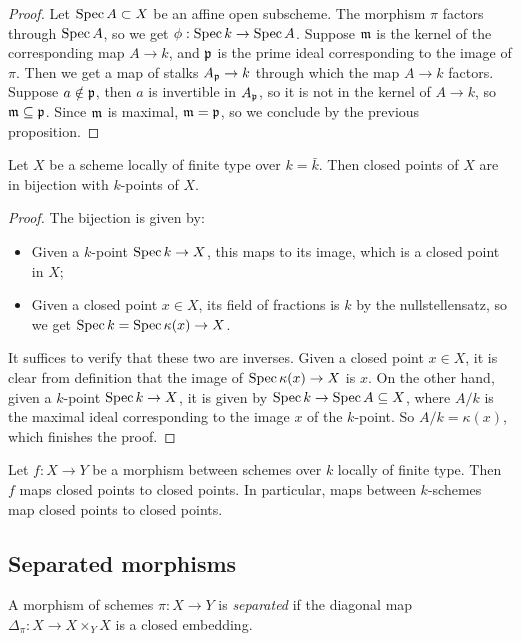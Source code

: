 \documentclass[11pt]{amsart}
\begin{document}
\begin{proof}
Let $\operatorname{Spec} A \subset X$ be an affine open subscheme. The morphism $\pi$ factors through $\operatorname{Spec} A$, so we get $\phi: \operatorname{Spec} k \to \operatorname{Spec} A$. Suppose $\mathfrak{m}$ is the kernel of the corresponding map $A\to k$, and $\mathfrak{p}$ is the prime ideal corresponding to the image of $\pi$. Then we get a map of stalks $A_{\mathfrak{p}}\to k$ through which the map $A\to k$ factors. Suppose $a\notin \mathfrak{p}$, then $a$ is invertible in $A_{\mathfrak{p}}$, so it is not in the kernel of $A\to k$, so $\mathfrak{m}\subseteq \mathfrak{p}$. Since $\mathfrak{m}$ is maximal, $\mathfrak{m} = \mathfrak{p}$, so we conclude by the previous proposition.
\end{proof}

\begin{prop}
Let $X$ be a scheme locally of finite type over $k = \bar{k}$. Then closed points of $X$ are in bijection with $k$-points of $X$.
\end{prop}


\begin{proof}
The bijection is given by:
\begin{itemize}
    \item Given a $k$-point $\operatorname{Spec} k \to X$, this maps to its image, which is a closed point in $X$;
    \item Given a closed point $x\in X$, its field of fractions is $k$ by the nullstellensatz, so we get $\operatorname{Spec} k = \operatorname{Spec} \kappa(x) \to X$.
\end{itemize}
It suffices to verify that these two are inverses. Given a closed point $x\in X$, it is clear from definition that the image of $\operatorname{Spec} \kappa(x) \to X$ is $x$. On the other hand, given a $k$-point $\operatorname{Spec} k \to X$, it is given by $\operatorname{Spec} k \to \operatorname{Spec} A \subseteq X$, where $A/k$ is the maximal ideal corresponding to the image $x$ of the $k$-point. So $A/k = \kappa(x)$, which finishes the proof.
\end{proof}

\begin{cor}
Let $f:X\to Y$ be a morphism between schemes over $k$ locally of finite type. Then $f$ maps closed points to closed points. In particular, maps between $k$-schemes map closed points to closed points.
\end{cor}


\subsection{Separated morphisms}

\begin{defn}
A morphism of schemes $\pi:X\to Y$ is \emph{separated} if the diagonal map $\Delta_{\pi}: X\to X\times_Y X$ is a closed embedding.
\end{defn}
\end{document}

